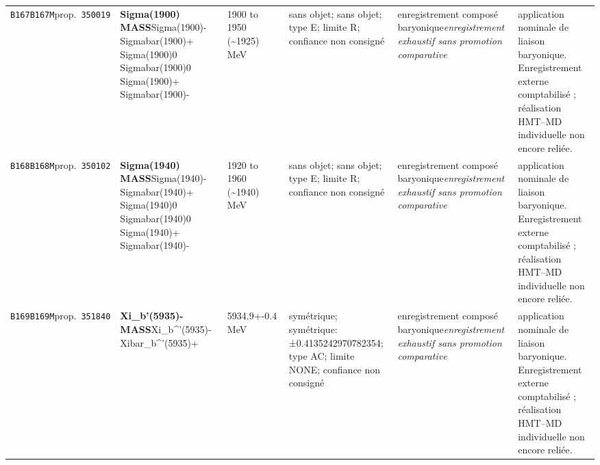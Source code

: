 \begin{landscape}
\begin{longtable}{L{1.85cm}L{4.45cm}L{2.35cm}L{4.05cm}L{3.35cm}L{7.15cm}}
\texttt{B167}\newline \texttt{B167M}\newline prop.\ \texttt{350019} & \textbf{Sigma(1900) MASS}\newline Sigma(1900)- \textbar{}\allowbreak{} Sigmabar(1900)+ \textbar{}\allowbreak{} Sigma(1900)0 \textbar{}\allowbreak{} Sigmabar(1900)0 \textbar{}\allowbreak{} Sigma(1900)+ \textbar{}\allowbreak{} Sigmabar(1900)- & 1900 to 1950 (\textasciitilde{}1925)\,MeV & sans objet; sans objet; type E; limite R; confiance non consigné & enregistrement composé baryonique\newline \emph{enregistrement exhaustif sans promotion comparative} & application nominale de liaison baryonique. Enregistrement externe comptabilisé ; réalisation HMT--MD individuelle non encore reliée. \\
\texttt{B168}\newline \texttt{B168M}\newline prop.\ \texttt{350102} & \textbf{Sigma(1940) MASS}\newline Sigma(1940)- \textbar{}\allowbreak{} Sigmabar(1940)+ \textbar{}\allowbreak{} Sigma(1940)0 \textbar{}\allowbreak{} Sigmabar(1940)0 \textbar{}\allowbreak{} Sigma(1940)+ \textbar{}\allowbreak{} Sigmabar(1940)- & 1920 to 1960 (\textasciitilde{}1940)\,MeV & sans objet; sans objet; type E; limite R; confiance non consigné & enregistrement composé baryonique\newline \emph{enregistrement exhaustif sans promotion comparative} & application nominale de liaison baryonique. Enregistrement externe comptabilisé ; réalisation HMT--MD individuelle non encore reliée. \\
\texttt{B169}\newline \texttt{B169M}\newline prop.\ \texttt{351840} & \textbf{Xi\_\allowbreak{}b'(5935)- MASS}\newline Xi\_\allowbreak{}b\textasciicircum{}'(5935)- \textbar{}\allowbreak{} Xibar\_\allowbreak{}b\textasciicircum{}'(5935)+ & 5934.9+-0.4\,MeV & symétrique; symétrique: ±0.4135242970782354; type AC; limite NONE; confiance non consigné & enregistrement composé baryonique\newline \emph{enregistrement exhaustif sans promotion comparative} & application nominale de liaison baryonique. Enregistrement externe comptabilisé ; réalisation HMT--MD individuelle non encore reliée. \\

\end{longtable}
\end{landscape}
